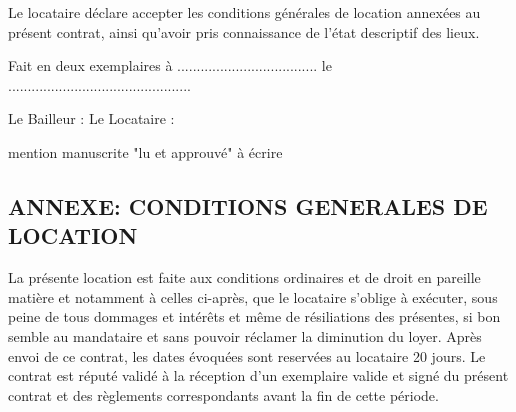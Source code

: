 \documentclass[a4paper,11pt]{article}
\begin{document}
\vspace{0.5cm}

Le locataire déclare accepter les conditions générales de location annexées au présent contrat, ainsi qu'avoir pris connaissance de l'état descriptif des lieux.

\vspace{0.5cm}

Fait en deux exemplaires à .................................... le ...............................................

\vspace{0.5cm}

Le Bailleur : \hspace{3cm}Le Locataire : 

\hspace{5.2cm}mention manuscrite "lu et approuvé" à écrire


\newpage{}




\begin{center}
\section*  { ANNEXE: CONDITIONS GENERALES  DE LOCATION}
\end{center}


\tiny



La présente location est faite aux conditions ordinaires et de droit en pareille matière et notamment à celles ci-après, que le locataire s’oblige à exécuter, sous peine de tous dommages et intérêts et même de résiliations des présentes, si bon semble au mandataire et sans pouvoir réclamer la diminution du loyer.
Après envoi de ce contrat, les dates évoquées sont reservées au locataire 20 jours. Le contrat est réputé validé à la réception d’un exemplaire valide et signé du présent contrat et des règlements correspondants avant la fin de cette période.
\end{document}
